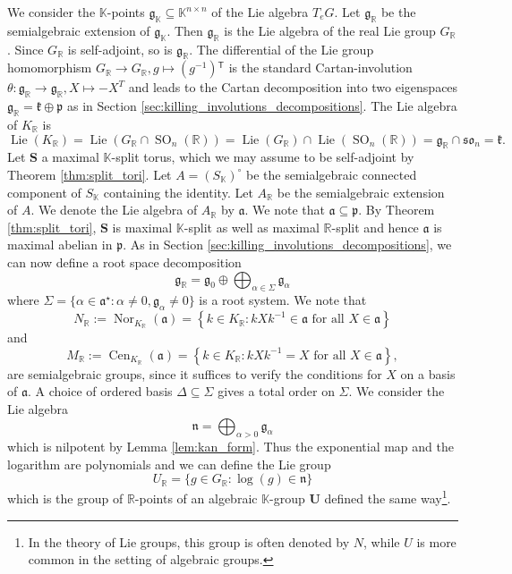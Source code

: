 \documentclass[12pt]{amsart}
\newcommand{\R}{\mathbb{R} }
\newcommand{\K}{\mathbb{K}}
\newcommand{\frakg}{\mathfrak{g}}
\newcommand{\frakp}{\mathfrak{p}}
\newcommand{\frakk}{\mathfrak{k}}
\newcommand{\fraka}{\mathfrak{a}}
\newcommand{\frakn}{\mathfrak{n}}
\newcommand{\bS}{\mathbf{S}}
\newcommand{\bU}{\mathbf{U}}
\newcommand{\tran}{{^{\mathsf{T}}\!}}
\numberwithin{equation}{section}
\theoremstyle{remark} %
\begin{document}
 We consider the $\K$-points $\frakg_\K \subseteq \K^{n\times n}$ of the Lie algebra $T_eG$.
 Let $\frakg_{\mathbb{R}}$ be the semialgebraic extension of $\frakg_\K$. Then $\frakg_{\R}$ is the Lie algebra of the real Lie group $G_{\mathbb{R}}$. Since $G_{\R}$ is self-adjoint, so is $\frakg_{\R}$. The differential of the Lie group homomorphism $G_{\R} \to G_{\R}, g \mapsto (g^{-1})\tran$ is the standard Cartan-involution $\theta \colon \frakg_{\R} \to \frakg_{\R}, X \mapsto -X^{T}$ and leads to the Cartan decomposition into two eigenspaces $\frakg_{\R} = \frakk \oplus \frakp$ as in Section \ref{sec:killing_involutions_decompositions}. The Lie algebra of $K_{\mathbb{R}}$ is 
$$
\operatorname{Lie}(K_{\R}) = \operatorname{Lie}(G_{\R} \cap \operatorname{SO}_n(\R)) = \operatorname{Lie}(G_{\R}) \cap \operatorname{Lie}(\operatorname{SO}_n(\R)) = \frakg_{\R} \cap \mathfrak{so}_n
 = \frakk.
 $$
Let $\bS$ a maximal $\K$-split torus, which we may assume to be self-adjoint by Theorem \ref{thm:split_tori}. 
Let $A = (S_{\K})^\circ$ be the semialgebraic connected component of $S_{\K}$ containing the identity. Let $A_{\R}$ be the semialgebraic extension of $A$. We denote the Lie algebra of $A_{\R}$ by $\fraka$. 
We note that $\fraka \subseteq \frakp$. By Theorem \ref{thm:split_tori}, $\bS$ is maximal $\K$-split as well as maximal $\R$-split and hence $\fraka$ is maximal abelian in $\frakp$. As in Section \ref{sec:killing_involutions_decompositions}, we can now define a root space decomposition 
$$
\frakg_{\R} = \frakg_0 \oplus \bigoplus_{\alpha \in \Sigma} \frakg_{\alpha}
$$
where $\Sigma = \{\alpha \in \fraka^{\star}\colon \alpha \neq 0, \frakg_{\alpha} \neq 0\}$ is a root system. 
We note that
$$
N_{\R} := \operatorname{Nor}_{K_{\R}}(\fraka) = \left\{ k \in K_{\R} \colon kXk^{-1} \in \fraka \text{ for all } X \in \fraka \right\} 
$$
and
$$
M_{\R} := \operatorname{Cen}_{K_{\R}}(\fraka) = \left\{ k \in K_{\R} \colon kXk^{-1} = X \text{ for all }  X \in \fraka  \right\},
$$
are semialgebraic groups, since it suffices to verify the conditions for $X$ on a basis of $\fraka$.
A choice of ordered basis $\Delta \subseteq \Sigma$ gives a total order on $\Sigma$. We consider the Lie algebra
$$
\frakn = \bigoplus_{\alpha >0} \frakg_{\alpha}
$$
which is nilpotent by Lemma \ref{lem:kan_form}. Thus the exponential map and the logarithm are polynomials and we can define the Lie group
$$
U_{\R} = \{ g \in G_{\R} \colon \log(g) \in \frakn \}
$$
which is the group of $\R$-points of an algebraic $\K$-group $\bU$ defined the same way\footnote{In the theory of Lie groups, this group is often denoted by $N$, while $U$ is more common in the setting of algebraic groups.}. 
\end{document}
